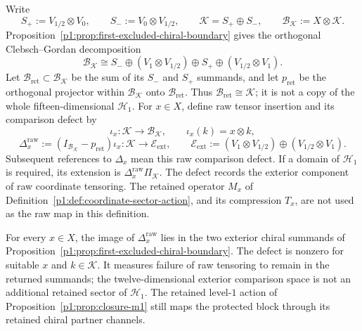 \documentclass[11pt]{article}
\begin{document}
\begin{definition}
\label{p1:def:compact-coordinate-closure-defect}
Write
\[
 S_+:=V_{1/2}\otimes V_0,\qquad
 S_-:=V_0\otimes V_{1/2},\qquad
 \mathcal K=S_+\oplus S_-,\qquad
 \mathcal B_{\mathcal K}:=X\otimes\mathcal K.
\]
Proposition~\ref{p1:prop:first-excluded-chiral-boundary} gives the orthogonal
Clebsch--Gordan decomposition
\[
 \mathcal B_{\mathcal K}
 \cong
 S_-\oplus(V_1\otimes V_{1/2})
 \oplus S_+\oplus(V_{1/2}\otimes V_1).
\]
Let \(\mathcal B_{\mathrm{ret}}\subset\mathcal B_{\mathcal K}\) be the
sum of its \(S_-\) and \(S_+\) summands, and let
\(p_{\mathrm{ret}}\) be the orthogonal projector within
\(\mathcal B_{\mathcal K}\) onto \(\mathcal B_{\mathrm{ret}}\).
Thus \(\mathcal B_{\mathrm{ret}}\cong\mathcal K\); it is not a copy of
the whole fifteen-dimensional \(\mathcal H_1\).
For \(x\in X\), define raw tensor insertion and its comparison defect by
\[
 \iota_x:\mathcal K\longrightarrow\mathcal B_{\mathcal K},
 \qquad \iota_x(k)=x\otimes k,
\]
\[
 \Delta_x^{\mathrm{raw}}
 :=(I_{\mathcal B_{\mathcal K}}-p_{\mathrm{ret}})\iota_x:
 \mathcal K\longrightarrow\mathcal E_{\mathrm{ext}},
 \qquad
 \mathcal E_{\mathrm{ext}}
 :=(V_1\otimes V_{1/2})\oplus(V_{1/2}\otimes V_1).
\]
Subsequent references to \(\Delta_x\) mean this raw comparison defect.
If a domain of \(\mathcal H_1\) is required, its extension is
\(\Delta_x^{\mathrm{raw}}\Pi_{\mathcal K}\).
The defect records the exterior component of raw coordinate tensoring.
The retained operator \(M_x\) of
Definition~\ref{p1:def:coordinate-sector-action}, and its compression
\(T_x\), are not used as the raw map in this definition.
\end{definition}

\begin{proposition}
\label{p1:prop:compact-coordinate-defect-status}
For every \(x\in X\), the image of \(\Delta_x^{\mathrm{raw}}\) lies in
the two exterior chiral summands of
Proposition~\ref{p1:prop:first-excluded-chiral-boundary}.
The defect is nonzero for suitable \(x\) and \(k\in\mathcal K\).
It measures failure of raw tensoring to remain in the returned summands;
the twelve-dimensional exterior comparison space is not an additional
retained sector of \(\mathcal H_1\).
The retained level-\(1\) action of
Proposition~\ref{p1:prop:closure-m1} still maps the protected block through
its retained chiral partner channels.
\end{proposition}
\end{document}
